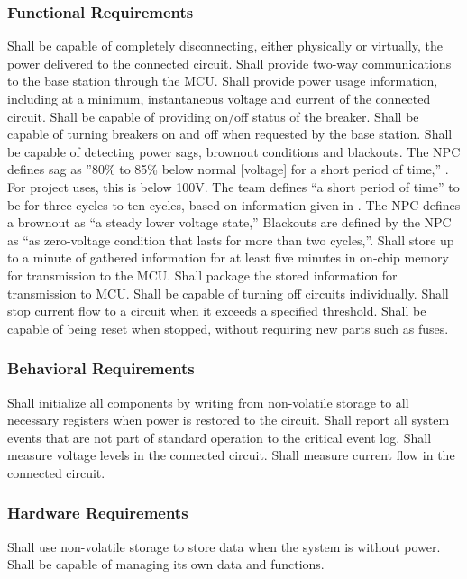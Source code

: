 \subsubsection{Functional Requirements}
\begin{outline}[enumerate]
\1 Shall be capable of completely disconnecting, either physically or virtually, the power delivered to the connected circuit.
\1 Shall provide two-way communications to the base station through the \ac{MCU}.
\2 Shall provide power usage information, including at a minimum, instantaneous voltage and current of the connected circuit.
\2 Shall be capable of providing on/off status of the breaker.
\2 Shall be capable of turning breakers on and off when requested by the base station.
\1 Shall be capable of detecting power sags, brownout conditions and blackouts.
\2 The \ac{NPC} defines sag as ''80\% to 85\% below normal [voltage] for a short period of time,'' \cite{natpow}. For project uses, this is below 100V. The team defines ``a short period of time'' to be for three cycles to ten cycles, based on information given in \cite{VoltSag}. The \ac{NPC} defines a brownout as ``a steady lower voltage state,'' \cite{natpow} Blackouts are defined by the \ac{NPC} as ``as zero-voltage condition that lasts for more than two cycles,''\cite{natpow}.
\1 Shall store up to a minute of gathered information for at least five minutes in on-chip memory for transmission to the \ac{MCU}.
\1 Shall package the stored information for transmission to \ac{MCU}.
\1 Shall be capable of turning off circuits individually.
\1 Shall stop current flow to a circuit when it exceeds a specified threshold.
\1 Shall be capable of being reset when stopped, without requiring new parts such as fuses.
\end{outline}

\subsubsection{Behavioral Requirements}
\begin{outline}[enumerate]
\1 Shall initialize all components by writing from non-volatile storage to all necessary registers when power is restored to the circuit.
\1 Shall report all system events that are not part of standard operation to the critical event log.
\1 Shall measure voltage levels in the connected circuit.
\1 Shall measure current flow in the connected circuit.
\end{outline}

\subsubsection{Hardware Requirements}
\begin{outline}[enumerate]
\1 Shall use non-volatile storage to store data when the system is without power.
\1 Shall be capable of managing its own data and functions.
\end{outline}

